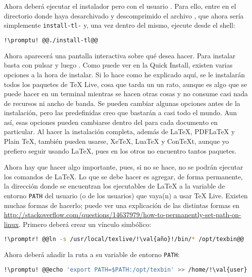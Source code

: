 Ahora deberá ejecutar el instalador pero con el usuario . Para ello, entre en el directorio
donde haya desarchivado y descomprimido el archivo , que ahora sería simplemente
\texttt{install-tl-} y, una vez dentro del mismo, ejecute desde el shell:

\begin{lstlisting}[gobble=2,language=bash,style=bashinteract,escapechar=!]
  !\promptu! @@./install-tl@@
\end{lstlisting}

\noindent Ahora aparecerá una pantalla interactiva sobre qué desea hacer. Para instalar basta con pulsar
 y luego . Como puede ver en la Quick Install, existen varias opciones a la hora de
instalar. Si lo hace como he explicado aquí, se le instalarán todos los paquetes de \TeX{} Live, cosa que
tarda un un rato, aunque es algo que se puede hacer en un terminal mientras se hacen otras cosas y no consume
casi nada de recursos ni ancho de banda. Se pueden cambiar algunas opciones antes de la instalación, pero las
predefinidas creo que bastarán a casi todo el mundo. Aun así, esas opciones pueden cambiarse dentro del
 para cada documento en particular. Al hacer la instalación completa, además de \LaTeX,
PDF\LaTeX{} y Plain \TeX, también pueden usarse, XeTeX, LuaTeX y ConTeXt, aunque yo prefiero seguir usando
\LaTeX, pues en los otros no encuentro tantos paquetes.

Ahora hay que hacer algo importante, pues, si no se hace, no se podrán ejecutar los comandos de \LaTeX. Lo que
se debe hacer es agregar, de forma permanente, la dirección donde se encuentran los ejecutables de \LaTeX{} a
la variable de entorno \lstinline+PATH+ del usuario (o de los usuarios) que vaya(n) a usar \TeX{} Live. Existen
muchas formas de hacerlo; puede ver una explicación de las distintas formas en
\url{http://stackoverflow.com/questions/14637979/how-to-permanently-set-path-on-linux}. Primero deberá crear
un vínculo simbólico:

\begin{lstlisting}[gobble=2,language=bash,style=bashinteract,escapechar=!]
  !\promptr! @@ln -s /usr/local/texlive/!\val{año}!/bin/* /opt/texbin@@
\end{lstlisting}

Ahora deberá añadir la ruta  a su variable de entorno \lstinline+PATH+:

\begin{lstlisting}[gobble=2,language=bash,style=bashinteract,escapechar=!]
  !\promptu! @@echo 'export PATH=$PATH:/opt/texbin' >> /home/!\val{user}!/.bashrc@@
\end{lstlisting}

